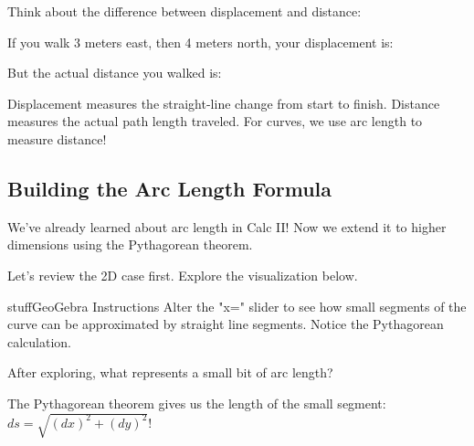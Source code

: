 \documentclass{ximera}
\begin{document}
\begin{problem}
Think about the difference between displacement and distance:

If you walk 3 meters east, then 4 meters north, your displacement is:
\begin{multipleChoice}
\end{multipleChoice}

But the actual distance you walked is:
\begin{multipleChoice}
\end{multipleChoice}

\begin{feedback}
Displacement measures the straight-line change from start to finish. Distance measures the actual path length traveled. For curves, we use arc length to measure distance!
\end{feedback}
\end{problem}

\subsection*{Building the Arc Length Formula}

We've already learned about arc length in Calc II! Now we extend it to higher dimensions using the Pythagorean theorem.

\begin{problem}
Let's review the 2D case first. Explore the visualization below.

\begin{expandable}{stuff}{GeoGebra Instructions}
    Alter the "x=" slider to see how small segments of the curve can be approximated by straight line segments. Notice the Pythagorean calculation.
\end{expandable}

\begin{center}
\end{center}

After exploring, what represents a small bit of arc length?
\begin{multipleChoice}
\end{multipleChoice}

\begin{feedback}
The Pythagorean theorem gives us the length of the small segment: $ds = \sqrt{(dx)^2 + (dy)^2}$!
\end{feedback}
\end{problem}
\end{document}

